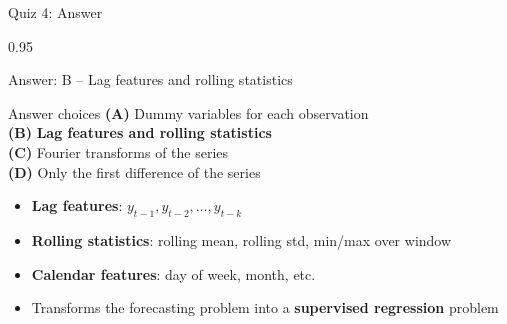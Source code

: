 \documentclass[9pt, aspectratio=169, t]{beamer}
\begin{document}
\begin{frame}{Quiz 4: Answer}
    \begin{cminipage}{0.95\textwidth}
    {\small
    \begin{exampleblock}{Answer: B -- Lag features and rolling statistics}
    \begin{block}{Answer choices}
        \textcolor{MainBlue}{\textbf{(A)}} Dummy variables for each observation \incorrect\\[2pt]
        \textcolor{MainBlue}{\textbf{(B)}} \textbf{\textcolor{Forest}{Lag features and rolling statistics}} \correct\\[2pt]
        \textcolor{MainBlue}{\textbf{(C)}} Fourier transforms of the series \incorrect\\[2pt]
        \textcolor{MainBlue}{\textbf{(D)}} Only the first difference of the series \incorrect
    \end{block}

        \vspace{0.1cm}

        \begin{itemize}\setlength{\itemsep}{0pt}
            \item \textbf{Lag features}: $y_{t-1}, y_{t-2}, \ldots, y_{t-k}$
            \item \textbf{Rolling statistics}: rolling mean, rolling std, min/max over window
            \item \textbf{Calendar features}: day of week, month, etc.
            \item Transforms the forecasting problem into a \textbf{supervised regression} problem
        \end{itemize}
    \end{exampleblock}
    }
    \end{cminipage}
\end{frame}
\end{document}

